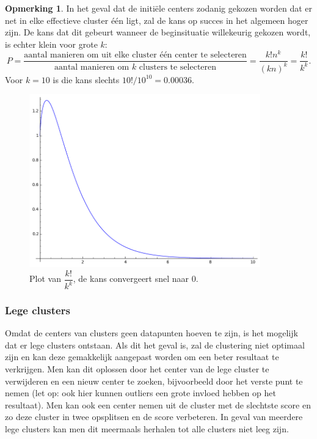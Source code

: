\documentclass[a4paper,12pt]{article}
\theoremstyle{definition}
\newtheorem{opm}{Opmerking}[subsection]
\begin{document}
\begin{opm}
In het geval dat de initiële centers zodanig gekozen worden dat er net in
elke effectieve cluster één ligt, zal de kans op succes in het algemeen hoger zijn.
De kans dat dit gebeurt wanneer de beginsituatie willekeurig gekozen wordt, is
echter klein voor grote $k$: $$P = \dfrac{\text{aantal manieren om uit elke
cluster één center te selecteren}}{\text{aantal manieren om $k$ clusters te
selecteren}} = \dfrac{k!n^k}{(kn)^k} = \dfrac{k!}{k^k}.$$ Voor $k=10$ is die kans
slechts $10!/10^{10} = 0.00036$.


 \begin{figure}[!ht]\centering
  \includegraphics[width=10cm]{kans_plot.png}
  \caption{Plot van $\dfrac{k!}{k^k}$, de kans convergeert snel naar $0$.}
  \label{fig:kmeans_bad}
 \end{figure}
 
\end{opm}

\newpage
\subsubsection{Lege clusters}
Omdat de centers van clusters geen datapunten hoeven te zijn, is het mogelijk
dat er lege clusters ontstaan. Als dit het geval is, zal de
clustering niet optimaal zijn en kan deze gemakkelijk aangepast worden om
een beter resultaat te verkrijgen.
Men kan dit oplossen door het center van de lege cluster te verwijderen en
een nieuw center te zoeken, bijvoorbeeld door het verste punt te nemen (let
op: ook hier kunnen outliers een grote invloed hebben op het resultaat). Men kan
ook een center nemen uit de cluster met de slechtste score en zo deze cluster in
twee opsplitsen en de score verbeteren. In geval van meerdere lege clusters
kan men dit meermaals herhalen tot alle clusters niet leeg zijn.
\end{document}
